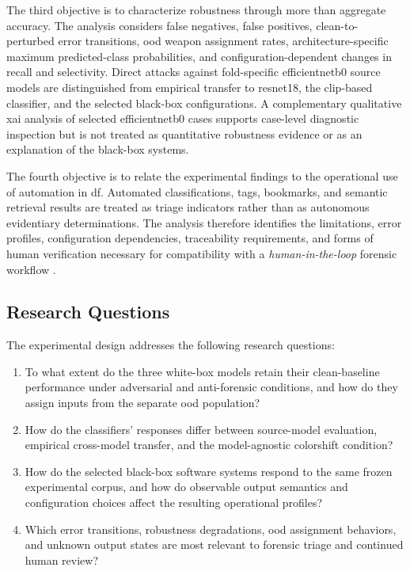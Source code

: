 The third objective is to characterize robustness through more than aggregate
accuracy. The analysis considers false negatives, false positives,
clean-to-perturbed error transitions, \gls{ood} weapon assignment rates,
architecture-specific maximum predicted-class probabilities, and
configuration-dependent changes in recall and selectivity. Direct attacks
against fold-specific \gls{efficientnetb0} source models are distinguished from
empirical transfer to \gls{resnet18}, the \gls{clip}-based classifier, and the selected
black-box configurations. A complementary qualitative \gls{xai} analysis of
selected \gls{efficientnetb0} cases supports case-level diagnostic inspection but is
not treated as quantitative robustness evidence or as an explanation of the
black-box systems.

The fourth objective is to relate the experimental findings to the operational
use of automation in \gls{df}. Automated classifications, tags, bookmarks, and
semantic retrieval results are treated as triage indicators rather than as
autonomous evidentiary determinations. The analysis therefore identifies the
limitations, error profiles, configuration dependencies, traceability
requirements, and forms of human verification necessary for compatibility with
a \textit{human-in-the-loop} forensic workflow
\cite{costantini2019digital,faqir2023digital,sanna2024preliminary}.

\subsection{Research Questions}
\label{subsec:introduction-research-questions}

The experimental design addresses the following research questions:

\begin{enumerate}
    \item[\textbf{RQ1.}] To what extent do the three white-box models retain
    their clean-baseline performance under adversarial and anti-forensic
    conditions, and how do they assign inputs from the separate \gls{ood}
    population?

    \item[\textbf{RQ2.}] How do the classifiers' responses differ between
    source-model evaluation, empirical cross-model transfer, and the
    model-agnostic \gls{colorshift} condition?

    \item[\textbf{RQ3.}] How do the selected black-box software systems respond
    to the same frozen experimental corpus, and how do observable output
    semantics and configuration choices affect the resulting operational
    profiles?

    \item[\textbf{RQ4.}] Which error transitions, robustness degradations,
    \gls{ood} assignment behaviors, and unknown output states are most
    relevant to forensic triage and continued human review?
\end{enumerate}

